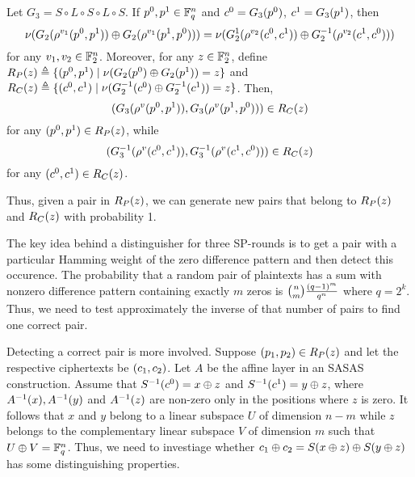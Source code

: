 \documentclass[twoside]{article}
\begin{document}
\begin{theorem}
    \label{thm:yoyo-3-rounds}
    Let \(G_3 = S \circ L \circ S \circ L \circ S\). If \(p^0, p^1 \in \mathbb F_q^n\)
    and \(c^0 = G_3(p^0)\), \(c^1 = G_3(p^1)\), then
    \begin{equation}
        \nu(G_2(\rho^{v_1}(p^0, p^1)) \oplus G_2(\rho^{v_1}(p^1, p^0))) = \nu(G_2^{1}(\rho^{v_2}(c^0, c^1)) \oplus G_2^{-1}(\rho^{v_2}(c^1, c^0)))
    \end{equation}
    for any \(v_1, v_2 \in \mathbb F_2^n\). Moreover, for any \(z \in \mathbb F_2^n\),
    define \(R_P(z) \triangleq \{(p^0, p^1) \mid
    \nu(G_2(p^0) \oplus G_2(p^1)) = z\}\) and \(R_C(z)
    \triangleq \{(c^0, c^1) \mid \nu(G_2^{-1}(c^0) \oplus
    G_2^{-1}(c^1)) = z\}\). Then,
    \begin{equation}
        (G_3(\rho^v(p^0, p^1)), G_3(\rho^v(p^1, p^0))) \in R_C(z)
    \end{equation}
    for any \((p^0, p^1) \in R_P(z)\), while
    \begin{equation}
        (G_3^{-1}(\rho^v(c^0, c^1)), G_3^{-1}(\rho^v(c^1, c^0))) \in R_C(z)
    \end{equation}
    for any \((c^0, c^1) \in R_C(z)\).
\end{theorem}

Thus, given a pair in \(R_P(z)\), we can generate new pairs that belong to
\(R_P(z)\) and \(R_C(z)\) with probability 1. 

The key idea behind a distinguisher for three SP-rounds is to get a pair with a
particular Hamming weight of the zero difference pattern and then detect this
occurence. The probability that a random pair of plaintexts has a sum with
nonzero difference pattern containing exactly \(m\) zeros is
\(\binom{n}{m}\frac{(q-1)^m}{q^n}\) where \(q = 2^k\). Thus, we need to
test approximately the inverse of that number of pairs to find one correct pair.

Detecting a correct pair is more involved. Suppose \((p_1, p_2) \in
R_P(z)\) and let the respective ciphertexts be \((c_1, c_2)\). Let
\(A\) be the affine layer in an SASAS construction. Assume that
\(S^{-1}(c^0) = x \oplus z\) and \(S^{-1}(c^1) = y \oplus z\), where
\(A^{-1}(x), A^{-1}(y)\) and \(A^{-1}(z)\) are non-zero only in
the positions where \(z\) is zero. It follows that \(x\) and \(y\) belong to a
linear subspace \(U\) of dimension \(n - m\) while \(z\) belongs to the
complementary linear subspace \(V\) of dimension \(m\) such that \(U \oplus V =
\mathbb F_q^n\). Thus, we need to investiage whether \(c_1 \oplus c_2 = S(x
\oplus z) \oplus S(y \oplus z)\) has some distinguishing properties.
\end{document}
